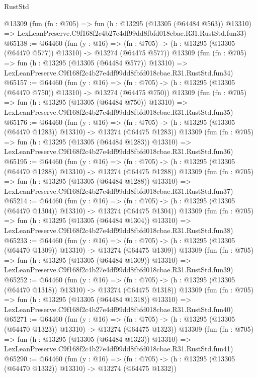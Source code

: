 \begin{lexlean}{RustStd}
\begin{coremodule}
    @13309
    (fun (fn : @705) =>
    fun (h : @13295 (@13305 (@64484 @563)) @13310) =>
    LexLeanPreserve.C9f168f2c4b27e4df99dd8fbfd018cbae.R31.RustStd.fun33)
@65138 := @64460
    (fun (y : @16) =>
    (fn : @705) -> (h : @13295 (@13305 (@64470 @577)) @13310) -> @13274 (@64475 @577))
    @13309
    (fun (fn : @705) =>
    fun (h : @13295 (@13305 (@64484 @577)) @13310) =>
    LexLeanPreserve.C9f168f2c4b27e4df99dd8fbfd018cbae.R31.RustStd.fun34)
@65157 := @64460
    (fun (y : @16) =>
    (fn : @705) -> (h : @13295 (@13305 (@64470 @750)) @13310) -> @13274 (@64475 @750))
    @13309
    (fun (fn : @705) =>
    fun (h : @13295 (@13305 (@64484 @750)) @13310) =>
    LexLeanPreserve.C9f168f2c4b27e4df99dd8fbfd018cbae.R31.RustStd.fun35)
@65176 := @64460
    (fun (y : @16) =>
    (fn : @705) -> (h : @13295 (@13305 (@64470 @1283)) @13310) -> @13274 (@64475 @1283))
    @13309
    (fun (fn : @705) =>
    fun (h : @13295 (@13305 (@64484 @1283)) @13310) =>
    LexLeanPreserve.C9f168f2c4b27e4df99dd8fbfd018cbae.R31.RustStd.fun36)
@65195 := @64460
    (fun (y : @16) =>
    (fn : @705) -> (h : @13295 (@13305 (@64470 @1288)) @13310) -> @13274 (@64475 @1288))
    @13309
    (fun (fn : @705) =>
    fun (h : @13295 (@13305 (@64484 @1288)) @13310) =>
    LexLeanPreserve.C9f168f2c4b27e4df99dd8fbfd018cbae.R31.RustStd.fun37)
@65214 := @64460
    (fun (y : @16) =>
    (fn : @705) -> (h : @13295 (@13305 (@64470 @1304)) @13310) -> @13274 (@64475 @1304))
    @13309
    (fun (fn : @705) =>
    fun (h : @13295 (@13305 (@64484 @1304)) @13310) =>
    LexLeanPreserve.C9f168f2c4b27e4df99dd8fbfd018cbae.R31.RustStd.fun38)
@65233 := @64460
    (fun (y : @16) =>
    (fn : @705) -> (h : @13295 (@13305 (@64470 @1309)) @13310) -> @13274 (@64475 @1309))
    @13309
    (fun (fn : @705) =>
    fun (h : @13295 (@13305 (@64484 @1309)) @13310) =>
    LexLeanPreserve.C9f168f2c4b27e4df99dd8fbfd018cbae.R31.RustStd.fun39)
@65252 := @64460
    (fun (y : @16) =>
    (fn : @705) -> (h : @13295 (@13305 (@64470 @1318)) @13310) -> @13274 (@64475 @1318))
    @13309
    (fun (fn : @705) =>
    fun (h : @13295 (@13305 (@64484 @1318)) @13310) =>
    LexLeanPreserve.C9f168f2c4b27e4df99dd8fbfd018cbae.R31.RustStd.fun40)
@65271 := @64460
    (fun (y : @16) =>
    (fn : @705) -> (h : @13295 (@13305 (@64470 @1323)) @13310) -> @13274 (@64475 @1323))
    @13309
    (fun (fn : @705) =>
    fun (h : @13295 (@13305 (@64484 @1323)) @13310) =>
    LexLeanPreserve.C9f168f2c4b27e4df99dd8fbfd018cbae.R31.RustStd.fun41)
@65290 := @64460
    (fun (y : @16) =>
    (fn : @705) -> (h : @13295 (@13305 (@64470 @1332)) @13310) -> @13274 (@64475 @1332))

\end{coremodule}
\end{lexlean}
